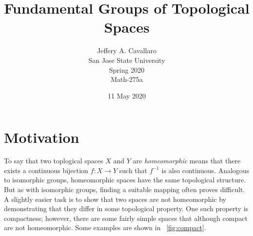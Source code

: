 \documentclass[letterpaper,12pt,fleqn]{article}
\begin{document}
\title{Fundamental Groups of Topological Spaces}
\author{Jeffery A. Cavallaro \\ San Jose State University \\ Spring 2020 \\ Math-275a}
\date{11 May 2020}

\maketitle

\section*{Motivation}

To say that two toplogical spaces \(X\) and \(Y\) are \emph{homeomorphic} means that there exists a continuous
bijection \(f:X\to Y\) such that \(f^{-1}\) is also continuous.  Analogous to isomorphic groups, homeomorphic
spaces have the same topological structure.  But as with isomorphic groups, finding a suitable mapping often
proves difficult.  A slightly easier task is to show that two spaces are not homeomorphic by demonstrating that
they differ in some topological property.  One such property is compactness; however, there are some fairly
simple spaces that although compact are not homeomorphic.  Some examples are shown in
\figurename\ \ref{fig:compact}.
\end{document}
